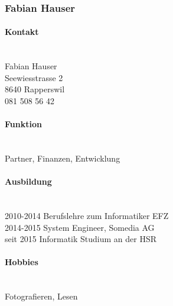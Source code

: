 \subsubsection{Fabian Hauser}
\noindent\begin{minipage}{0.7\textwidth}
	\paragraph{Kontakt} \hfill \\
	Fabian Hauser \\
	Seewiesstrasse 2 \\
	8640 Rapperswil \\
	081 508 56 42 \\
	
	\paragraph{Funktion} \hfill \\
	Partner, Finanzen, Entwicklung \\
	
	\paragraph{Ausbildung} \hfill \\
	2010-2014 \hspace{2cm} Berufslehre zum Informatiker EFZ \\
	2014-2015 \hspace{2cm} System Engineer, Somedia AG \\
	seit 2015 \hspace{2.2cm} Informatik Studium an der HSR \\
	
	\paragraph{Hobbies} \hfill \\
	Fotografieren, Lesen \\
\end{minipage}
\hfill
